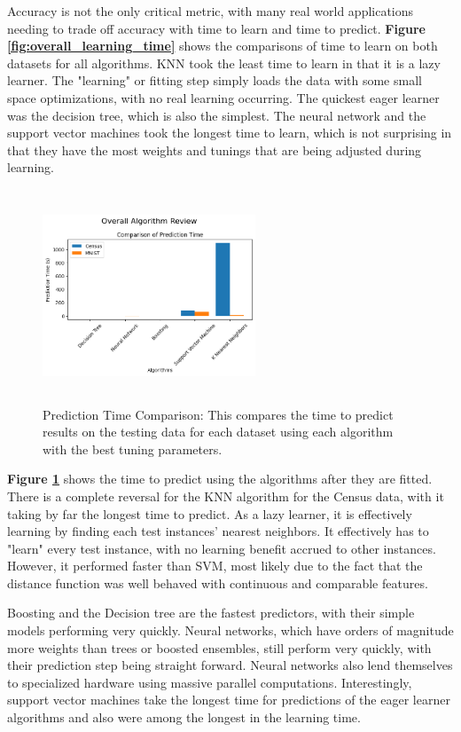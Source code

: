 \documentclass[letterpaper]{article} %
\begin{document}
Accuracy is not the only critical metric, with many real world applications needing to trade off accuracy with time to learn and time to predict.  \textbf{Figure \ref{fig:overall_learning_time}} shows the comparisons of time to learn on both datasets for all algorithms.  KNN took the least time to learn in that it is a lazy learner.  The "learning" or fitting step simply loads the data with some small space optimizations, with no real learning occurring.  The quickest eager learner was the decision tree, which is also the simplest.  The neural network and the support vector machines took the longest time to learn, which is not surprising in that they have the most weights and tunings that are being adjusted during learning. 
 
\begin{figure}[h]
\centering
\includegraphics[width=2.5in, height=2.5in]{figures/Overall_Algorithm_ReviewComparison_of_Prediction_Time_.png}
\caption{Prediction Time Comparison:  This compares the time to predict results on the testing data for each dataset using each algorithm with the best tuning parameters.  }
\label{fig:overall_prediction_time}
\end{figure}
 
\textbf{Figure \ref{fig:overall_prediction_time}} shows the time to predict using the algorithms after they are fitted.  There is a complete reversal for the KNN algorithm for the Census data, with it taking by far the longest time to predict.  As a lazy learner, it is effectively learning by finding each test instances' nearest neighbors.  It effectively has to "learn" every test instance, with no learning benefit accrued to other instances.  However, it performed faster than SVM, most likely due to the fact that the distance function was well behaved with continuous and comparable features.

Boosting and the Decision tree are the fastest predictors, with their simple models performing very quickly.  Neural networks, which have orders of magnitude more weights than trees or boosted ensembles, still perform very quickly, with their prediction step being straight forward.  Neural networks also lend themselves to specialized hardware using massive parallel computations. Interestingly, support vector machines take the longest time for predictions of the eager learner algorithms and also were among the longest in the learning time.  
\end{document}
